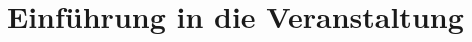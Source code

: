 \section{Einf\"uhrung in die Veranstaltung}
\begin{frame} %
\titlepage
\end{frame}

\frame{\sectionpage}

%
%

